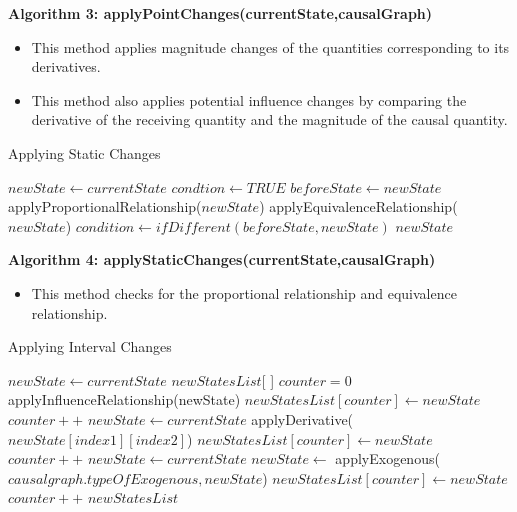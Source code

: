 \documentclass{article}
\begin{document}
\textbf{Algorithm 3: applyPointChanges(currentState,causalGraph)}
\begin{itemize}
	\item This method applies magnitude changes of the quantities corresponding to its derivatives. 
	\item This method also applies potential influence changes by comparing the derivative of the receiving quantity and the magnitude of the causal quantity.
\end{itemize}

\begin{algorithm}[!h]
	\caption{Applying Static Changes}\label{staticchanges}
	\begin{algorithmic}[1]
		\State $newState \gets currentState$
		\State $condtion \gets TRUE$
		\State $beforeState \gets newState$
		\State applyProportionalRelationship($newState$)
		\EndIf
		\State applyEquivalenceRelationship($newState$)
		\EndIf
		\State $condition \gets ifDifferent(beforeState,newState)$
		\EndFor
		\EndWhile
		\State \Return $newState$
		\EndProcedure
	\end{algorithmic}
\end{algorithm}


\textbf{Algorithm 4: applyStaticChanges(currentState,causalGraph)}
\begin{itemize}
	\item This method checks for the proportional relationship and equivalence relationship.
\end{itemize}

\begin{algorithm}[!h]
	\caption{Applying Interval Changes}\label{intervalchanges}
	\begin{algorithmic}[1]
		\State $newState \gets currentState$
		\State $newStatesList$[ ]
		\State $counter=0$
		\State applyInfluenceRelationship(newState)
		\EndIf
		\State $newStatesList[counter] \gets newState$
		\State $counter++$
		\EndIf
		\EndFor
		\State $newState \gets currentState$
		\State applyDerivative($newState[index1][index2]$)
		\State $newStatesList[counter] \gets newState$
		\State $counter++$
		\EndIf
		\EndFor
		\EndFor
		\State $newState \gets currentState$
		\State $newState \gets$ applyExogenous($causalgraph.typeOfExogenous,newState$)
		\State $newStatesList[counter] \gets newState$
		\State $counter++$
		\EndIf
		\State \Return $newStatesList$
		\EndProcedure
	\end{algorithmic}
\end{algorithm}
\end{document}
